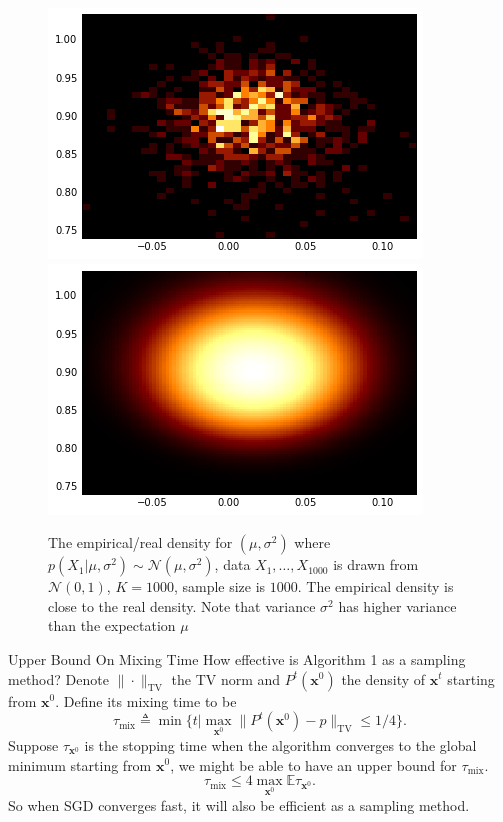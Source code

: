 \documentclass[final]{beamer}
\newlength{\onecolwid}
\newcommand{\bx}{\mathbf{x}}
\newcommand{\E}{\mathbb{E}}
\newcommand{\N}{\mathscr{N}}
\begin{document}
\begin{frame}[t]
\begin{columns}[t]
\begin{column}{\onecolwid}
\begin{figure}
\includegraphics[width=0.5\linewidth]{../figure/simulation2_empirical.png}
\includegraphics[width=0.5\linewidth]{../figure/simulation2_real.png}
\caption{The empirical/real density for $(\mu, \sigma^2)$ where $p(X_1|\mu, \sigma^2)\sim \N(\mu, \sigma^2)$, data $X_1,\ldots, X_{1000}$ is drawn from $\N(0, 1)$, $K = 1000$, sample size is $1000$. The empirical density is close to the real density. Note that variance $\sigma^2$ has higher variance than the expectation $\mu$}
\end{figure}



\begin{block}{Upper Bound On Mixing Time}
How effective is Algorithm 1 as a sampling method? Denote $\|\cdot\|_{\mathrm{TV}}$ the TV norm and $P^t(\bx^0)$ the density of $\bx^t$ starting from $\bx^0$. Define its mixing time to be
\[
\tau_{\mathrm{mix}} \triangleq \min\{t|\max_{\bx^0}\|P^t(\bx^0) - p\|_{\mathrm{TV}}\leq 1/4\}.
\]
Suppose $\tau_{\bx^0}$ is the stopping time when the algorithm converges to the global minimum starting from $\bx^0$, we might be able to have an upper bound for $\tau_{\mathrm{mix}}$.
\[
\tau_{\mathrm{mix}} \leq 4 \max_{\bx^0}\E \tau_{\bx^0}.
\]
So when SGD converges fast, it will also be efficient as a sampling method.
\end{block}



\end{column}
\end{columns}
\end{frame}
\end{document}
